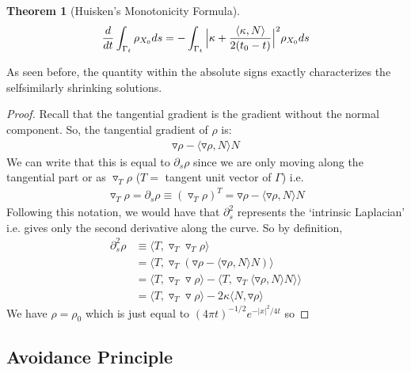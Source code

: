 \documentclass{article}
\newtheorem{theorem}{Theorem}
\begin{document}
\begin{theorem}[Huisken's Monotonicity Formula]
	\begin{align}
		\frac{d}{dt} \int_{\Gamma_t} \rho_{X_0}ds = -\int_{\Gamma_t} \Big{|}\kappa + \frac{\langle \kappa, N\rangle}{2(t_0-t)}\Big{|}^2\rho_{X_0}ds
	\end{align}
\end{theorem}
As seen before, the quantity within the absolute signs exactly characterizes the selfsimilarly shrinking solutions.
\begin{proof}
	Recall that the tangential gradient is the gradient without the normal component. So, the tangential gradient of $\rho$ is:
	\begin{align} \triangledown \rho - \langle \triangledown \rho, N \rangle N \end{align}
	We can write that this is equal to $\partial_s \rho$ since we are only moving along the tangential part or as $\triangledown_T \rho$ ($T =$ tangent
	unit vector of $\Gamma$) i.e.
	\begin{align} 
		\triangledown_T \rho = \partial_s \rho \equiv (\triangledown_T \rho)^T = \triangledown \rho - \langle \triangledown \rho, N\rangle N
	\end{align}
	Following this notation, we would have that $\partial_s^2$ represents the `intrinsic Laplacian' i.e. gives only the second derivative along the curve.
	So by definition,
	\begin{align} 
		\partial_s^2 \rho &\equiv \langle T, \triangledown_T \triangledown_T \rho\rangle  \\
			&= \langle T, \triangledown_T (\triangledown \rho - \langle \triangledown \rho, N\rangle N)\rangle \\
            &= \langle T, \triangledown_T \triangledown \rho\rangle - \langle T, \triangledown_T \langle \triangledown \rho, N\rangle N\rangle \rangle \\
            &= \langle T, \triangledown_T \triangledown \rho\rangle - 2\kappa \langle N, \triangledown \rho\rangle
	\end{align}
    We have $\rho = \rho_0$ which is just equal to $(4\pi t)^{-1/2}e^{-|x|^2/4t}$ so
\end{proof}

\subsection{Avoidance Principle}
\end{document}
